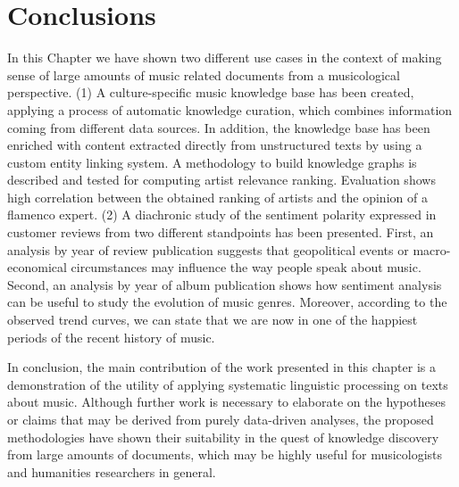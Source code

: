 \section{Conclusions}
\label{sec:musicology:conclusions}

In this Chapter we have shown two different use cases in the context of making sense of large amounts of music related documents from a musicological perspective. (1) A culture-specific music knowledge base has been created, applying a process of automatic knowledge curation, which combines information coming from different data sources. In addition, the knowledge base has been enriched with content extracted directly from unstructured texts by using a custom entity linking system. A methodology to build knowledge graphs is described and tested for computing artist relevance ranking. Evaluation shows high correlation between the obtained ranking of artists and the opinion of a flamenco expert. 
(2) A diachronic study of the sentiment polarity expressed in customer reviews from two different standpoints has been presented. First, an analysis by year of review publication suggests that geopolitical events or macro-economical circumstances may influence the way people speak about music. Second, an analysis by year of album publication shows how sentiment analysis can be useful to study the evolution of music genres. Moreover, according to the observed trend curves, we can state that we are now in one of the happiest periods of the recent history of music. 

In conclusion, the main contribution of the work presented in this chapter is a demonstration of the utility of applying systematic linguistic processing on texts about music. Although further work is necessary to elaborate on the hypotheses or claims that may be derived from purely data-driven analyses, the proposed methodologies have shown their suitability in the quest of knowledge discovery from large amounts of documents, which may be highly useful for musicologists and humanities researchers in general.
